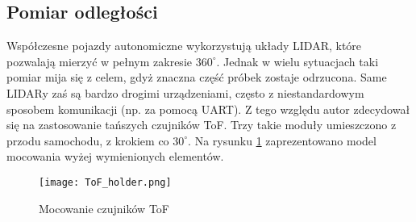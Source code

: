     


    \subsection{Pomiar odległości}
        Współczesne pojazdy autonomiczne wykorzystują układy LIDAR, które pozwalają mierzyć w pełnym zakresie $360^\circ$.
        Jednak w wielu sytuacjach taki pomiar mija się z celem, gdyż znaczna część próbek zostaje odrzucona.
        Same LIDARy zaś są bardzo drogimi urządzeniami, często z niestandardowym sposobem komunikacji (np. za pomocą UART).
        Z tego względu autor zdecydował się na zastosowanie tańszych czujników ToF.
        Trzy takie moduły umieszczono z przodu samochodu, z krokiem co $30^\circ$.
        Na rysunku \ref{fig:ToF_holder} zaprezentowano model mocowania wyżej wymienionych elementów.

        \begin{figure}[!ht]
            \centering
            \texttt{[image: ToF\_holder.png]}
            \caption{Mocowanie czujników ToF}
            \label{fig:ToF_holder}
        \end{figure}
